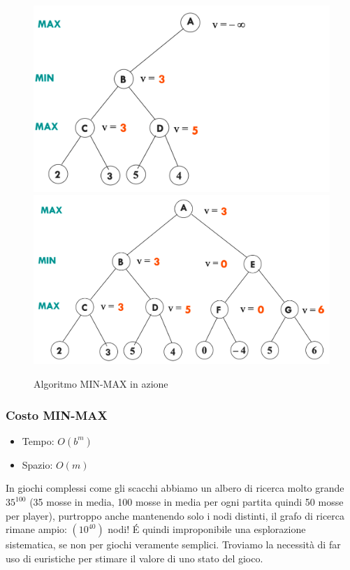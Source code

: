 \documentclass{article}
\begin{document}
\begin{figure}[H]
\includegraphics[scale=0.15]{Images/minmaxaction5.png}
\includegraphics[scale=0.15]{Images/minmaxaction6.png}
\caption{Algoritmo MIN-MAX in azione}
\end{figure}
\subsubsection{Costo MIN-MAX}
\begin{itemize}
    \item Tempo: $O(b^m)$
    \item Spazio: $O(m)$
\end{itemize}
In giochi complessi come gli scacchi abbiamo un albero di ricerca molto grande $35^{100}$ (35 mosse in media, 100 mosse in media per ogni partita quindi 50 mosse per player), purtroppo anche mantenendo solo i nodi distinti, il grafo di ricerca rimane ampio: $(10^{40})$ nodi! É quindi improponibile una esplorazione sistematica, se non per giochi veramente semplici. Troviamo la necessità di far uso di euristiche per stimare il valore di uno stato del gioco.
\end{document}
